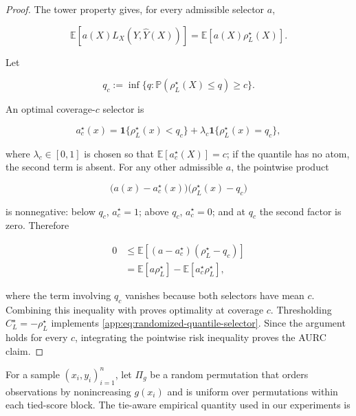\begin{proof}
The tower property gives, for every admissible selector $a$,

\begin{equation}
  \mathbb{E}\!\left[a(X)L_X(Y,\widehat Y(X))\right]
  =\mathbb{E}\!\left[a(X)\rho_L^\star(X)\right].
  \label{app:eq:tower-selector}
\end{equation}

Let

\begin{equation*}
  q_c:=\inf\{q:\mathbb{P}(\rho_L^\star(X)\leq q)\geq c\}.
\end{equation*}

An optimal coverage-$c$ selector is

\begin{equation}
  a_c^\star(x)
  =\mathbf{1}\{\rho_L^\star(x)<q_c\}
   +\lambda_c\mathbf{1}\{\rho_L^\star(x)=q_c\},
  \label{app:eq:randomized-quantile-selector}
\end{equation}

where $\lambda_c\in[0,1]$ is chosen so that
$\mathbb{E}[a_c^\star(X)]=c$; if the quantile has no atom, the second
term is absent.  For any other admissible $a$, the pointwise product

\begin{equation*}
  \big(a(x)-a_c^\star(x)\big)
  \big(\rho_L^\star(x)-q_c\big)
\end{equation*}

is nonnegative: below $q_c$, $a_c^\star=1$; above $q_c$,
$a_c^\star=0$; and at $q_c$ the second factor is zero.  Therefore

\begin{align*}
  0
  &\leq
  \mathbb{E}\!\left[
    (a-a_c^\star)(\rho_L^\star-q_c)\right] \\
  &=\mathbb{E}[a\rho_L^\star]
    -\mathbb{E}[a_c^\star\rho_L^\star],
\end{align*}

where the term involving $q_c$ vanishes because both selectors have
mean $c$.  Combining this inequality with
 proves optimality at coverage $c$.
Thresholding $C_L^\star=-\rho_L^\star$ implements
\cref{app:eq:randomized-quantile-selector}. Since the argument holds
for every $c$, integrating the pointwise risk inequality proves the
AURC claim.
\end{proof}

For a sample $(x_i,y_i)_{i=1}^n$, let $\Pi_g$ be a random permutation
that orders observations by nonincreasing $g(x_i)$ and is uniform over
permutations within each tied-score block. The tie-aware empirical quantity
used in our experiments is

